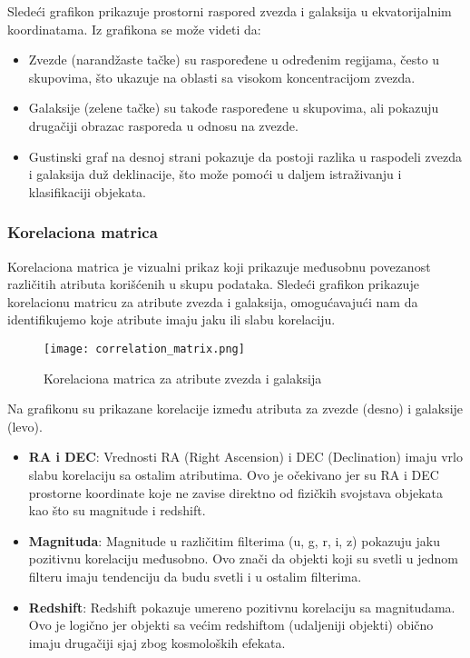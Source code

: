 \documentclass[a4paper,12pt]{article}
\begin{document}
Sledeći grafikon prikazuje prostorni raspored zvezda i galaksija u ekvatorijalnim koordinatama. Iz grafikona se može videti da:

\begin{itemize}
    \item Zvezde (narandžaste tačke) su raspoređene u određenim regijama, često u skupovima, što ukazuje na oblasti sa visokom koncentracijom zvezda.
    \item Galaksije (zelene tačke) su takođe raspoređene u skupovima, ali pokazuju drugačiji obrazac rasporeda u odnosu na zvezde.
    \item Gustinski graf na desnoj strani pokazuje da postoji razlika u raspodeli zvezda i galaksija duž deklinacije, što može pomoći u daljem istraživanju i klasifikaciji objekata.
\end{itemize}

\subsubsection{Korelaciona matrica}

Korelaciona matrica je vizualni prikaz koji prikazuje međusobnu povezanost različitih atributa korišćenih u skupu podataka. Sledeći grafikon prikazuje korelacionu matricu za atribute zvezda i galaksija, omogućavajući nam da identifikujemo koje atribute imaju jaku ili slabu korelaciju.

\begin{figure}[h!]
\centering
\texttt{[image: correlation\_matrix.png]}
\caption{Korelaciona matrica za atribute zvezda i galaksija}
\label{fig:correlation_matrix}
\end{figure}

Na grafikonu su prikazane korelacije između atributa za zvezde (desno) i galaksije (levo).

\begin{itemize}
    \item \textbf{RA i DEC}: Vrednosti RA (Right Ascension) i DEC (Declination) imaju vrlo slabu korelaciju sa ostalim atributima. Ovo je očekivano jer su RA i DEC prostorne koordinate koje ne zavise direktno od fizičkih svojstava objekata kao što su magnitude i redshift.
    \item \textbf{Magnituda}: Magnitude u različitim filterima (u, g, r, i, z) pokazuju jaku pozitivnu korelaciju međusobno. Ovo znači da objekti koji su svetli u jednom filteru imaju tendenciju da budu svetli i u ostalim filterima.
    \item \textbf{Redshift}: Redshift pokazuje umereno pozitivnu korelaciju sa magnitudama. Ovo je logično jer objekti sa većim redshiftom (udaljeniji objekti) obično imaju drugačiji sjaj zbog kosmoloških efekata.
\end{itemize}
\end{document}

